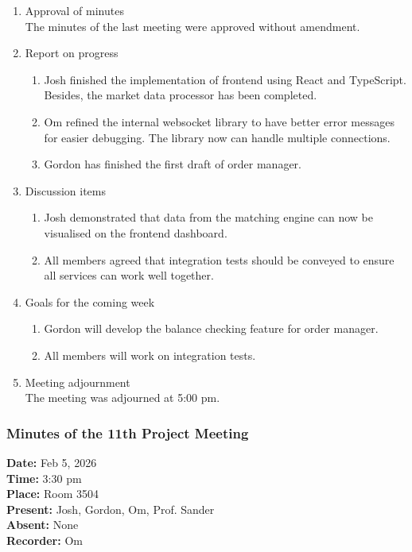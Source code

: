 \documentclass[12pt,a4paper]{article}
\begin{document}
\begin{enumerate}
\item Approval of minutes\\
The minutes of the last meeting were approved without amendment.\\
\item Report on progress
\begin{enumerate}
\item Josh finished the implementation of frontend using React and TypeScript. Besides, the market data processor has been completed.\\
\item Om refined the internal websocket library to have better error messages for easier debugging. The library now can handle multiple connections.\\
\item Gordon has finished the first draft of order manager.\\
\end{enumerate}
\item Discussion items
\begin{enumerate}
\item Josh demonstrated that data from the matching engine can now be visualised on the frontend dashboard.\\
\item All members agreed that integration tests should be conveyed to ensure all services can work well together.\\
\end{enumerate}
\item Goals for the coming week
\begin{enumerate}
\item Gordon will develop the balance checking feature for order manager.\\
\item All members will work on integration tests.\\
\end{enumerate}
\item Meeting adjournment\\
The meeting was adjourned at 5:00 pm.
\end{enumerate}

\subsubsection{Minutes of the 11th Project Meeting}
\textbf{Date:} Feb 5, 2026\\
\textbf{Time:} 3:30 pm\\
\textbf{Place:} Room 3504\\
\textbf{Present:} Josh, Gordon, Om, Prof. Sander\\
\textbf{Absent:} None\\
\textbf{Recorder:} Om
\end{document}
